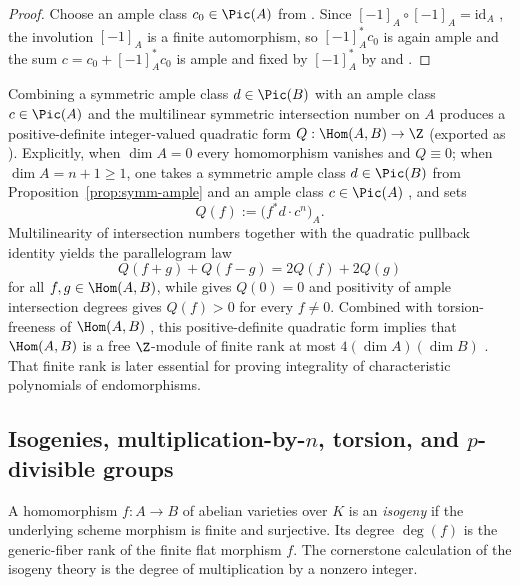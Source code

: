\begin{proof}
Choose an ample class $c_0 \in \Pic(A)$ from
. Since
$[-1]_A \circ [-1]_A = \mathrm{id}_A$
, the involution $[-1]_A$
is a finite automorphism, so $[-1]_A^* c_0$ is again ample and the sum
$c = c_0 + [-1]_A^* c_0$ is ample and fixed by $[-1]_A^*$ by
 and
.
\end{proof}

Combining a symmetric ample class $d \in \Pic(B)$ with an ample class
$c \in \Pic(A)$ and the multilinear symmetric intersection number on $A$
 produces a positive-definite
integer-valued quadratic form $Q : \Hom(A, B) \to \Z$
 (exported as
). Explicitly, when
$\dim A = 0$ every homomorphism vanishes and $Q \equiv 0$; when
$\dim A = n + 1 \ge 1$, one takes a symmetric ample class $d \in \Pic(B)$ from
Proposition~\ref{prop:symm-ample} and an ample class $c \in \Pic(A)$
, and sets
\[
  Q(f) := \bigl(f^* d \cdot c^n\bigr)_A.
\]
Multilinearity of intersection numbers together with the quadratic pullback
identity  yields the
parallelogram law
\[
  Q(f + g) + Q(f - g) = 2 Q(f) + 2 Q(g)
\]
for all $f, g \in \Hom(A, B)$, while
 gives
$Q(0) = 0$ and positivity of ample intersection degrees gives $Q(f) > 0$ for
every $f \neq 0$. Combined with torsion-freeness of $\Hom(A, B)$
, this positive-definite
quadratic form implies that $\Hom(A, B)$ is a free $\Z$-module of finite rank
at most $4 (\dim A)(\dim B)$
. That finite
rank is later essential for proving integrality of characteristic polynomials
of endomorphisms.

\subsection{Isogenies, multiplication-by-$n$, torsion, and $p$-divisible groups}

A homomorphism $f : A \to B$ of abelian varieties over $K$ is an
\emph{isogeny}  if the underlying
scheme morphism is finite and surjective. Its degree $\deg(f)$
 is the generic-fiber rank of the finite
flat morphism $f$. The cornerstone calculation of the isogeny theory is the
degree of multiplication by a nonzero integer.

